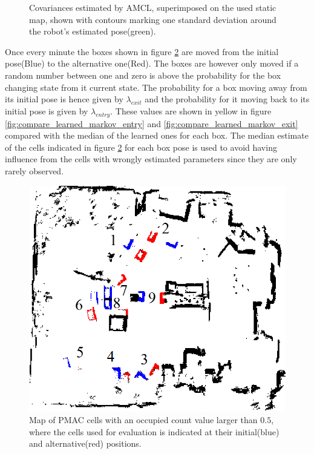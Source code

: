 \begin{figure}[htbp]
\begin{subfigure}[t]{0.2\textwidth}
    \end{subfigure}
    \caption{Covariances estimated by AMCL, superimposed on the used static map, shown with contours marking one standard deviation around the robot's estimated pose(green).}
    \label{fig:flexlab_path_with_covariance_with_cleaned_map}
\end{figure}

Once every minute the boxes shown in figure \ref{fig:cells_used_for_evaluation_with_identification} are moved from  the initial pose(Blue) to the alternative one(Red). 
The boxes are however only moved if a random number between one and zero is above the probability for the box changing state from it current state.
The probability for a box moving away from its initial pose is hence given by $\lambda_{exit}$ and the probability for it moving back to its initial pose is given by $\lambda_{entry}$.
These values are shown in yellow in figure \ref{fig:compare_learned_markov_entry} and \ref{fig:compare_learned_markov_exit} compared with the median of the learned ones for each box.
The median estimate of the cells indicated in figure \ref{fig:cells_used_for_evaluation_with_identification} for each box pose is used to avoid having influence from the cells with wrongly estimated parameters since they are only rarely observed.

\begin{figure}
    \centering
    \includegraphics[scale=1.0]{chapters/evaluation/figures/cells_used_for_evaluation_with_identification}
    \caption{Map of PMAC cells with an occupied count value larger than $0.5$, where the cells used for evaluation is indicated at their initial(blue) and alternative(red) positions.}
    \label{fig:cells_used_for_evaluation_with_identification}
\end{figure}

